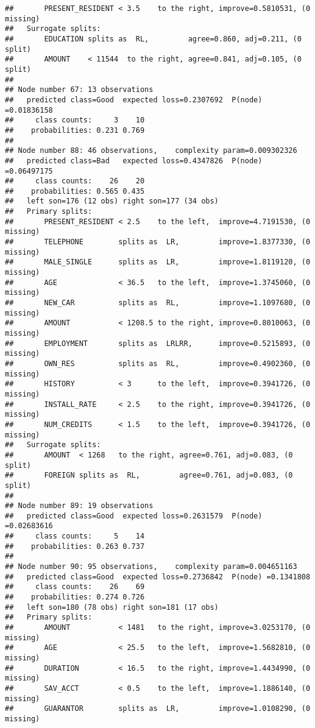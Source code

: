 \documentclass[
]{article}
\begin{document}
\begin{verbatim}
##       PRESENT_RESIDENT < 3.5    to the right, improve=0.5810531, (0 missing)
##   Surrogate splits:
##       EDUCATION splits as  RL,         agree=0.860, adj=0.211, (0 split)
##       AMOUNT    < 11544  to the right, agree=0.841, adj=0.105, (0 split)
## 
## Node number 67: 13 observations
##   predicted class=Good  expected loss=0.2307692  P(node) =0.01836158
##     class counts:     3    10
##    probabilities: 0.231 0.769 
## 
## Node number 88: 46 observations,    complexity param=0.009302326
##   predicted class=Bad   expected loss=0.4347826  P(node) =0.06497175
##     class counts:    26    20
##    probabilities: 0.565 0.435 
##   left son=176 (12 obs) right son=177 (34 obs)
##   Primary splits:
##       PRESENT_RESIDENT < 2.5    to the left,  improve=4.7191530, (0 missing)
##       TELEPHONE        splits as  LR,         improve=1.8377330, (0 missing)
##       MALE_SINGLE      splits as  LR,         improve=1.8119120, (0 missing)
##       AGE              < 36.5   to the left,  improve=1.3745060, (0 missing)
##       NEW_CAR          splits as  RL,         improve=1.1097680, (0 missing)
##       AMOUNT           < 1208.5 to the right, improve=0.8010063, (0 missing)
##       EMPLOYMENT       splits as  LRLRR,      improve=0.5215893, (0 missing)
##       OWN_RES          splits as  RL,         improve=0.4902360, (0 missing)
##       HISTORY          < 3      to the left,  improve=0.3941726, (0 missing)
##       INSTALL_RATE     < 2.5    to the right, improve=0.3941726, (0 missing)
##       NUM_CREDITS      < 1.5    to the left,  improve=0.3941726, (0 missing)
##   Surrogate splits:
##       AMOUNT  < 1268   to the right, agree=0.761, adj=0.083, (0 split)
##       FOREIGN splits as  RL,         agree=0.761, adj=0.083, (0 split)
## 
## Node number 89: 19 observations
##   predicted class=Good  expected loss=0.2631579  P(node) =0.02683616
##     class counts:     5    14
##    probabilities: 0.263 0.737 
## 
## Node number 90: 95 observations,    complexity param=0.004651163
##   predicted class=Good  expected loss=0.2736842  P(node) =0.1341808
##     class counts:    26    69
##    probabilities: 0.274 0.726 
##   left son=180 (78 obs) right son=181 (17 obs)
##   Primary splits:
##       AMOUNT           < 1481   to the right, improve=3.0253170, (0 missing)
##       AGE              < 25.5   to the left,  improve=1.5682810, (0 missing)
##       DURATION         < 16.5   to the right, improve=1.4434990, (0 missing)
##       SAV_ACCT         < 0.5    to the left,  improve=1.1886140, (0 missing)
##       GUARANTOR        splits as  LR,         improve=1.0108290, (0 missing)

\end{verbatim}
\end{document}
